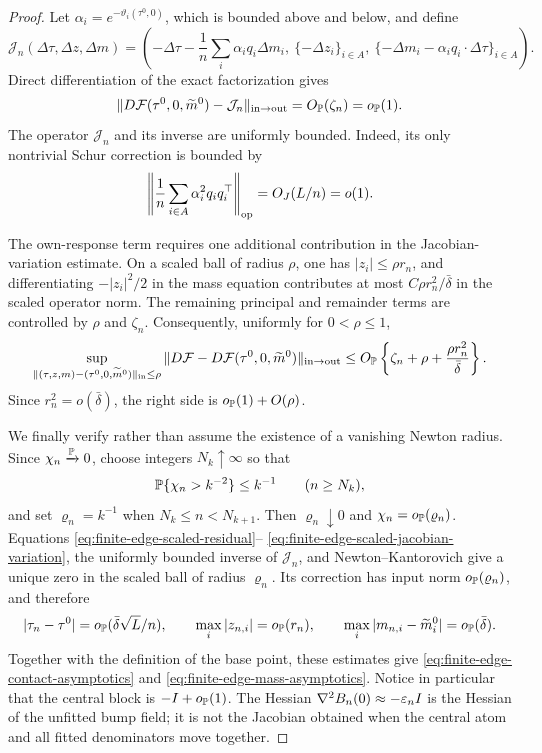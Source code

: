 \begin{proof}
Let \(\alpha_i=e^{-\vartheta_i(\tau^0,0)}\), which is bounded above and
below, and define
\[
 \mathcal J_n(\Delta\tau,\Delta z,\Delta m)
 =
 \left(
 -\Delta\tau-\frac1n\sum_i\alpha_iq_i\Delta m_i,\
 \{-\Delta z_i\}_{i\in A},\
 \{-\Delta m_i-\alpha_iq_i\cdot\Delta\tau\}_{i\in A}
 \right).
\]
Direct differentiation of the exact factorization gives
\begin{equation}
\label{eq:finite-edge-scaled-jacobian}
 \|D\mathcal F(\tau^0,0,\widetilde m^0)-\mathcal J_n\|_{{\rm in}\to{\rm out}}
 =O_{\mathbb P}(\zeta_n)=o_{\mathbb P}(1).
\end{equation}
The operator \(\mathcal J_n\) and its inverse are uniformly bounded.  Indeed,
its only nontrivial Schur correction is bounded by
\[
 \left\|\frac1n\sum_{i\in A}\alpha_i^2q_iq_i^\top\right\|_{\rm op}
 =O_J(L/n)=o(1).
\]

The own-response term requires one additional contribution in the
Jacobian-variation estimate.  On a scaled ball of radius \(\rho\), one has
\(|z_i|\le\rho r_n\), and differentiating
\(-|z_i|^2/2\) in the mass equation contributes at most
\(C\rho r_n^2/\bar\delta\) in the scaled operator norm.  The remaining
principal and remainder terms are controlled by \(\rho\) and \(\zeta_n\).
Consequently, uniformly for \(0<\rho\le1\),
\begin{equation}
\label{eq:finite-edge-scaled-jacobian-variation}
 \sup_{\|(\tau,z,m)-(\tau^0,0,\widetilde m^0)\|_{\rm in}\le\rho}
 \|D\mathcal F-D\mathcal F(\tau^0,0,\widetilde m^0)\|_{{\rm in}\to{\rm out}}
 \le
 O_{\mathbb P}\left\{\zeta_n+\rho+
                  \frac{\rho r_n^2}{\bar\delta}\right\}.
\end{equation}
Since \(r_n^2=o(\bar\delta)\), the right side is
\(o_{\mathbb P}(1)+O(\rho)\).

We finally verify rather than assume the existence of a vanishing Newton
radius.  Since \(\chi_n\xrightarrow{\mathbb P}0\), choose integers \(N_k\uparrow\infty\)
so that
\[
 \mathbb P\{\chi_n>k^{-2}\}\le k^{-1}\qquad(n\ge N_k),
\]
and set \(\varrho_n=k^{-1}\) when \(N_k\le n<N_{k+1}\).  Then
\(\varrho_n\downarrow0\) and
\(\chi_n=o_{\mathbb P}(\varrho_n)\).  Equations
\eqref{eq:finite-edge-scaled-residual}--
\eqref{eq:finite-edge-scaled-jacobian-variation}, the uniformly bounded
inverse of \(\mathcal J_n\), and Newton--Kantorovich give a unique zero in
the scaled ball of radius \(\varrho_n\).  Its correction has input norm
\(o_{\mathbb P}(\varrho_n)\), and therefore
\[
 |\tau_n-\tau^0|=o_{\mathbb P}(\bar\delta\sqrt L/n),
 \qquad
 \max_i|z_{n,i}|=o_{\mathbb P}(r_n),
 \qquad
 \max_i|m_{n,i}-\widetilde m_i^0|=o_{\mathbb P}(\bar\delta).
\]
Together with the definition of the base point, these estimates give
\eqref{eq:finite-edge-contact-asymptotics} and
\eqref{eq:finite-edge-mass-asymptotics}.  Notice in particular that the
central block is \(-I+o_{\mathbb P}(1)\).  The Hessian
\(\nabla^2B_n(0)\approx-\varepsilon_nI\) is the Hessian of the unfitted bump
field; it is not the Jacobian obtained when the central atom and all
fitted denominators move together.


\end{proof}
